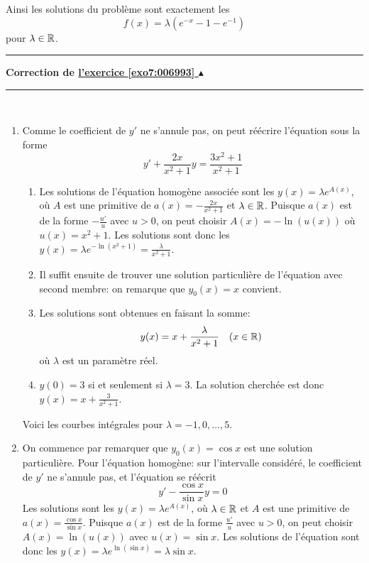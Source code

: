 \documentclass[11pt,a4paper]{article}
\newcounter{exo}
\newcommand{\correction}[1]{\hypertarget{cor7:#1}{}\label{cor7:#1}{\bf Correction de \hyperlink{exo7:#1}{l'exercice \ref{exo7:#1} $\blacktriangle$}}\vspace{1mm}\hrule\vspace{1mm}}
\newcommand{\fincorrection}{\vspace{1mm}\hrule\vspace*{7mm}}
\begin{document}
Ainsi les solutions du problème sont exactement les 
$$f(x)=\lambda(e^{-x}-1-e^{-1})$$
pour $\lambda\in\mathbb{R}$.
\fincorrection
\correction{006993}\
\begin{enumerate}
\item Comme le coefficient de $y'$ ne s'annule pas, on peut réécrire l'équation sous la forme
$$y'+\frac{2x}{x^2+1}y=\frac{3x^2+1}{x^2+1}$$
  \begin{enumerate}
    \item Les solutions de l'équation homogène associée sont les $y(x)=\lambda e^{A(x)}$, 
    où $A$ est une primitive de $a(x)=-\frac{2x}{x^2+1}$ et $\lambda\in\mathbb{R}$. 
    Puisque $a(x)$ est de la forme $-\frac{u'}{u}$ avec $u>0$, on peut choisir $A(x)=-\ln(u(x))$ 
    où $u(x)=x^2+1$. Les solutions sont donc les 
    $\displaystyle y(x)=\lambda e^{-\ln(x^2+1)}=\frac{\lambda}{x^2+1}$.
    
    \item Il suffit ensuite de trouver une solution particulière de l'équation 
    avec second membre: on remarque  que $y_0(x)=x$ convient.

    \item Les solutions sont obtenues en faisant la somme:  
    $$y(x)=x+\frac{\lambda}{x^2+1}\quad (x\in\mathbb{R})$$
    où $\lambda$ est un paramètre réel.
    
    \item $y(0)=3$ si et seulement si $\lambda=3$. La solution cherchée est donc
    $y(x)=x+\frac{3}{x^2+1}$.
  \end{enumerate}
  
  Voici les courbes intégrales pour $\lambda=-1,0,\ldots,5$.
  
  \begin{center}
\end{center}
  
\item On commence par remarquer que $y_0(x)=\cos x$ est une solution particulière. Pour l'équation homogène: sur l'intervalle considéré, le coefficient de $y'$ ne s'annule pas, et l'équation se réécrit
$$y'-\frac{\cos x}{\sin x}y=0$$
Les solutions sont les $y(x)=\lambda e^{A(x)}$, où $\lambda\in\mathbb{R}$ et $A$ est une primitive de $a(x)=\frac{\cos x}{\sin x}$. Puisque $a(x)$ est de la forme $\frac{u'}{u}$ avec $u>0$, on peut choisir $A(x)=\ln(u(x))$ avec $u(x)=\sin x$. Les solutions de l'équation sont donc les $\displaystyle y(x)=\lambda e^{\ln(\sin x)}=\lambda\sin x$.


\end{enumerate}
\end{document}
